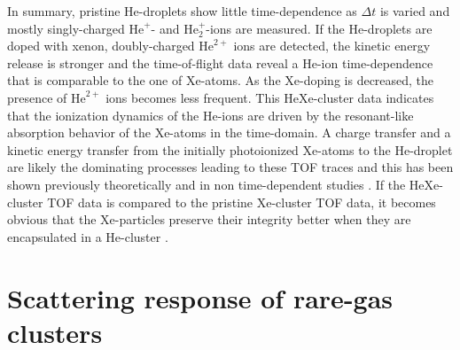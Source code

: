 %
In summary, pristine He-droplets show little time-dependence as $\Delta t$ is varied and mostly singly-charged $\text{He}^{+}$- and $\text{He}_{2}^{+}$-ions are measured. If the He-droplets are doped with xenon, doubly-charged $\text{He}^{2+}$ ions are detected, the kinetic energy release is stronger and the time-of-flight data reveal a He-ion time-dependence that is comparable to the one of Xe-atoms. As the Xe-doping is decreased, the presence of $\text{He}^{2+}$ ions becomes less frequent. This HeXe-cluster data indicates that the ionization dynamics of the He-ions are driven by the resonant-like absorption behavior of the Xe-atoms in the time-domain. A charge transfer and a kinetic energy transfer from the initially photoionized Xe-atoms to the He-droplet are likely the dominating processes leading to these TOF traces and this has been shown previously theoretically \cite{Hau-Riege-2007-PRL} and in non time-dependent studies \cite{Hoener-2008-JPB,Sugishima-2012-PRA,Muller-2015-JPhysB}. If the HeXe-cluster TOF data is compared to the pristine Xe-cluster TOF data, it becomes obvious that the Xe-particles preserve their integrity better when they are encapsulated in a He-cluster \cite{Hoener-2008-JPB,Muller-2015-JPhysB,Sugishima-2012-PRA}.
%
%
%
\section{Scattering response of rare-gas clusters}\label{sec:scattering-response}
%
%
%
%
